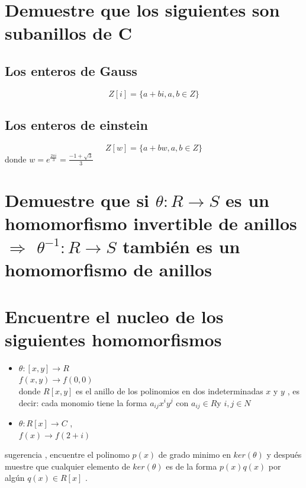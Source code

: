 \documentclass[10pt,a4paper]{article} %
\begin{document}
    \section{Demuestre que los siguientes son subanillos de C}
        \subsection{Los enteros de Gauss}
            \begin{equation}
                Z[i] = \{a + bi ,a,b \in Z \}
            \end{equation}

        \subsection{Los enteros de einstein}
        \begin{equation}
                Z[w] = \{a + bw ,a,b \in Z \}
        \end{equation}
        donde $ w = e ^{ \frac{2 \pi i}{3} } = \frac{-1 + \sqrt{3} }{3}  $

    \section{Demuestre que si $ \theta : R \to S  $ es un homomorfismo
    invertible de anillos $ \Rightarrow  $  $ \theta ^{-1} : R \to S  $ también
    es un homomorfismo de anillos}

    \section{Encuentre el nucleo de los siguientes homomorfismos}
    \begin{itemize}
        \item {        $ \theta :[x,y] \to R  $
    \\ $ f(x,y) \to f(0,0)  $
    \\ donde $ R[x,y]  $ es el anillo de los polinomios en dos indeterminadas $
    x  $ y $ y  $ , es decir: cada monomio  tiene la forma $ a_{ij}x ^{i} y
    ^{j}   $ con $ a_{ij} \in R $y $ i,j \in N  $}
    \item {$ \theta : R[x] \to C  $ ,
        \\ $ f(x) \to f(2+i)  $  }
    \end{itemize}

    sugerencia ,  encuentre el polinomo $ p(x)  $ de grado minimo en $
    ker(\theta )  $ y después muestre que cualquier elemento de $ ker(\theta )
    $ es de la forma $ p(x)q(x)  $   por algún $ q(x) \in R[x]  $ .










    \nocite{*}
    
    
\end{document}
